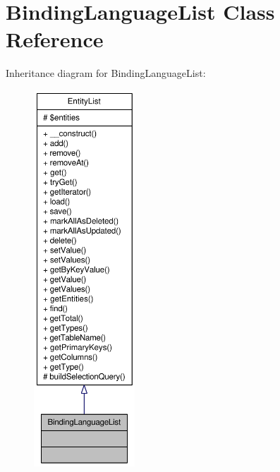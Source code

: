 \hypertarget{classBindingLanguageList}{
\section{BindingLanguageList Class Reference}
\label{classBindingLanguageList}
}


Inheritance diagram for BindingLanguageList:\nopagebreak
\begin{figure}[H]
\begin{center}
\leavevmode
\includegraphics[height=400pt]{classBindingLanguageList__inherit__graph}
\end{center}
\end{figure}


